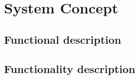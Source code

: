 \chapter{System Concept}\label{chap:concept}
\section{Functional description}\label{sec:uml1} 
\section{Functionality description}\label{sec:uml2} 

